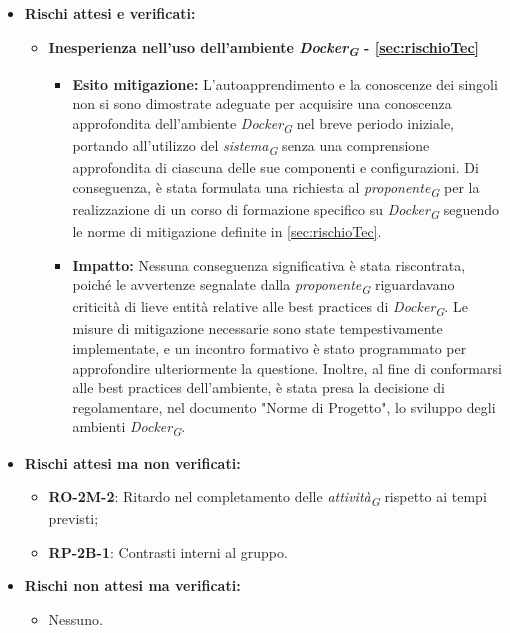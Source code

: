 \begin{itemize}
    \item \textbf{Rischi attesi e verificati:}
\begin{itemize}
    \item \textbf{Inesperienza nell'uso dell'ambiente \textit{Docker}\textsubscript{\textit{G}} - \ref{sec:rischioTec}}
    \begin{itemize}
        \item \textbf{Esito mitigazione:} 
            L'autoapprendimento e la conoscenze dei singoli non si sono dimostrate adeguate per acquisire una conoscenza approfondita dell'ambiente \textit{Docker}\textsubscript{\textit{G}} nel breve periodo iniziale, portando all'utilizzo del \textit{sistema}\textsubscript{\textit{G}} senza una comprensione approfondita di ciascuna delle sue componenti e configurazioni. Di conseguenza, è stata formulata una richiesta al \textit{proponente}\textsubscript{\textit{G}} per la realizzazione di un corso di formazione specifico su \textit{Docker}\textsubscript{\textit{G}} seguendo le norme di mitigazione definite in \ref{sec:rischioTec}.
        \item \textbf{Impatto:}
            Nessuna conseguenza significativa è stata riscontrata, poiché le avvertenze segnalate dalla \textit{proponente}\textsubscript{\textit{G}} riguardavano criticità di lieve entità relative alle best practices di \textit{Docker}\textsubscript{\textit{G}}. Le misure di mitigazione necessarie sono state tempestivamente implementate, e un incontro formativo è stato programmato per approfondire ulteriormente la questione.
            Inoltre, al fine di conformarsi alle best practices dell'ambiente, è stata presa la decisione di regolamentare, nel documento "Norme di Progetto", lo sviluppo degli ambienti \textit{Docker}\textsubscript{\textit{G}}.
    \end{itemize}
\end{itemize}
\item \textbf{Rischi attesi ma non verificati:}
 \begin{itemize}
    \item \textbf{RO-2M-2}: Ritardo nel completamento delle \textit{attività}\textsubscript{\textit{G}} rispetto ai tempi previsti;
    \item \textbf{RP-2B-1}: Contrasti interni al gruppo.
\end{itemize}
\item \textbf{Rischi non attesi ma verificati:}
\begin{itemize}
    \item Nessuno.
\end{itemize}
\end{itemize}

